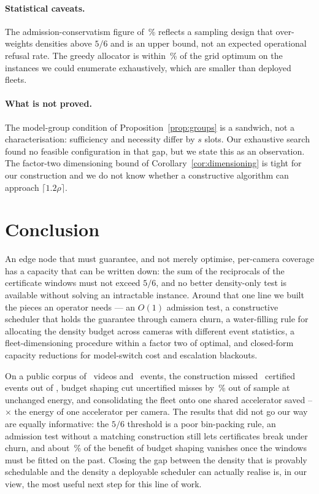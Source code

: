 \documentclass[final,5p,times,twocolumn]{elsarticle}
\theoremstyle{definition}
\newcommand{\dens}{\rho}
\begin{document}
\paragraph{Statistical caveats.} The admission-conservatism figure of \numConservPct\,\% reflects a
sampling design that over-weights densities above $5/6$ and is an upper bound, not an expected
operational refusal rate. The greedy allocator is within \numCsixGapMax\,\% of the grid optimum on
the instances we could enumerate exhaustively, which are smaller than deployed fleets.

\paragraph{What is not proved.} The model-group condition of Proposition~\ref{prop:groups} is a
sandwich, not a characterisation: sufficiency and necessity differ by $s$ slots. Our exhaustive
search found no feasible configuration in that gap, but we state this as an observation. The
factor-two dimensioning bound of Corollary~\ref{cor:dimensioning} is tight for our construction
and we do not know whether a constructive algorithm can approach $\lceil 1.2\dens\rceil$.

\section{Conclusion}\label{sec:conclusion}

An edge node that must guarantee, and not merely optimise, per-camera coverage has a capacity
that can be written down: the sum of the reciprocals of the certificate windows must not exceed
$5/6$, and no better density-only test is available without solving an intractable instance.
Around that one line we built the pieces an operator needs --- an $O(1)$ admission test, a constructive scheduler that
holds the guarantee through camera churn, a water-filling rule for allocating the density budget
across cameras with different event statistics, a fleet-dimensioning procedure within a factor two
of optimal, and closed-form capacity reductions for model-switch cost and escalation blackouts.

On a public corpus of \numVideos\ videos and \numEvents\ events, the construction missed
\numEtwoCertMissed\ certified events out of \numEtwoCertTotal, budget shaping cut uncertified
misses by \numHoldoutGain\,\% out of sample at unchanged energy, and consolidating the fleet onto
one shared accelerator saved \numGainMin--\numGainMax$\times$ the energy of one accelerator per
camera. The results that did not go our way are equally informative: the $5/6$ threshold is a poor
bin-packing rule, an admission test without a matching construction still lets certificates break
under churn, and about \numOracleShare\,\% of the benefit of budget shaping vanishes once the
windows must be fitted on the past. Closing the gap between the density that is provably
schedulable and the density a deployable scheduler can actually realise is, in our view, the most
useful next step for this line of work.
\end{document}
